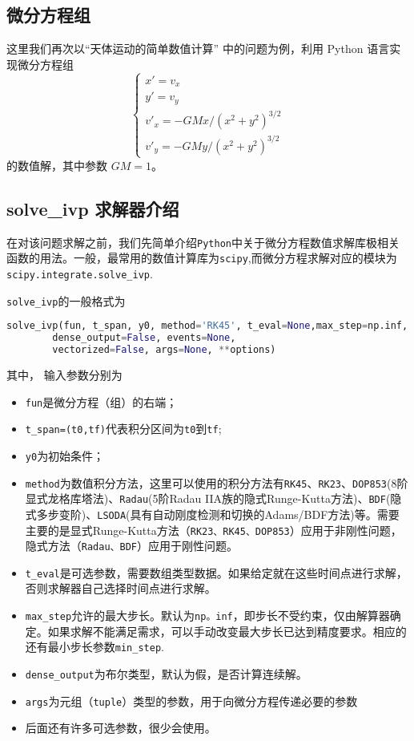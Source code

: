 \subsection{微分方程组}
这里我们再次以“天体运动的简单数值计算” 中的问题为例，利用 Python 语言实现微分方程组
\begin{equation}\label{eq_PyIVP_10}
\begin{cases}
x' = v_x\\
y' = v_y\\
v'_x = -GMx/(x^2 + y^2)^{3/2}\\
v'_y = -GMy/(x^2 + y^2)^{3/2}
\end{cases}
\end{equation}
的数值解，其中参数 $GM=1$。
\subsection{solve\_ivp 求解器介绍}
在对该问题求解之前，我们先简单介绍\verb|Python|中关于微分方程数值求解库极相关函数的用法。一般，最常用的数值计算库为\verb|scipy|,而微分方程求解对应的模块为\verb|scipy.integrate.solve_ivp|.

 \verb|solve_ivp|的一般格式为
 \begin{lstlisting}[language=python]
 solve_ivp(fun, t_span, y0, method='RK45', t_eval=None,max_step=np.inf,
        dense_output=False, events=None, 
        vectorized=False, args=None, **options)
 \end{lstlisting}
 其中， 输入参数分别为
\begin{itemize}
\item \verb|fun|是微分方程（组）的右端；
\item  \verb|t_span=(t0,tf)|代表积分区间为\verb|t0|到\verb|tf|;
\item  \verb|y0|为初始条件；
\item \verb|method|为数值积分方法，这里可以使用的积分方法有\verb|RK45|、\verb|RK23|、\verb|DOP853|(8阶显式龙格库塔法)、\verb|Radau|(5阶Radau IIA族的隐式Runge-Kutta方法)、\verb|BDF|(隐式多步变阶)、\verb|LSODA|(具有自动刚度检测和切换的Adams/BDF方法)等。需要主要的是显式Runge-Kutta方法（\verb|RK23、RK45、DOP853|）应用于非刚性问题，隐式方法（\verb|Radau、BDF|）应用于刚性问题。
\item \verb|t_eval|是可选参数，需要数组类型数据。如果给定就在这些时间点进行求解，否则求解器自己选择时间点进行求解。
\item \verb|max_step|允许的最大步长。默认为\verb|np。inf|，即步长不受约束，仅由解算器确定。如果求解不能满足需求，可以手动改变最大步长已达到精度要求。相应的还有最小步长参数\verb|min_step|.
\item \verb|dense_output|为布尔类型，默认为假，是否计算连续解。
\item \verb|args|为元组（\verb|tuple|）类型的参数，用于向微分方程传递必要的参数
\item 后面还有许多可选参数，很少会使用。
\end{itemize}

